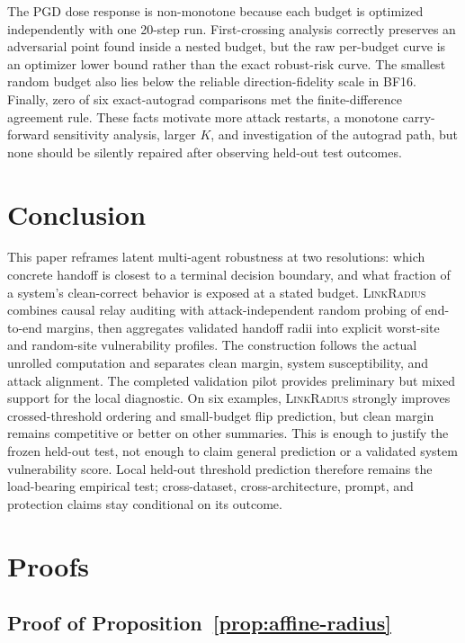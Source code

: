 \documentclass[11pt]{article}
\newcommand{\method}{\textsc{LinkRadius}}
\begin{document}
The PGD dose response is non-monotone because each budget is optimized
independently with one 20-step run. First-crossing analysis correctly preserves
an adversarial point found inside a nested budget, but the raw per-budget curve
is an optimizer lower bound rather than the exact robust-risk curve. The
smallest random budget also lies below the reliable direction-fidelity scale in
BF16. Finally, zero of six exact-autograd comparisons met the finite-difference
agreement rule. These facts motivate more attack restarts, a monotone
carry-forward sensitivity analysis, larger $K$, and investigation of the
autograd path, but none should be silently repaired after observing held-out
test outcomes.

\section{Conclusion}

This paper reframes latent multi-agent robustness at two resolutions: which
concrete handoff is closest to a terminal decision boundary, and what fraction
of a system's clean-correct behavior is exposed at a stated budget. \method{}
combines causal relay auditing with attack-independent random probing of
end-to-end margins, then aggregates validated handoff radii into explicit
worst-site and random-site vulnerability profiles. The construction follows the
actual unrolled computation and separates clean margin, system susceptibility,
and attack alignment. The completed validation pilot provides preliminary but
mixed support for the local diagnostic. On six examples, \method{} strongly
improves crossed-threshold ordering and small-budget flip prediction, but clean
margin remains competitive or better on other summaries. This is enough to
justify the frozen held-out test, not enough to claim general prediction or a
validated system vulnerability score. Local held-out threshold prediction
therefore remains the load-bearing empirical test; cross-dataset,
cross-architecture, prompt, and protection claims stay conditional on its
outcome.

\appendix

\section{Proofs}

\subsection{Proof of Proposition~\ref{prop:affine-radius}}
\end{document}
